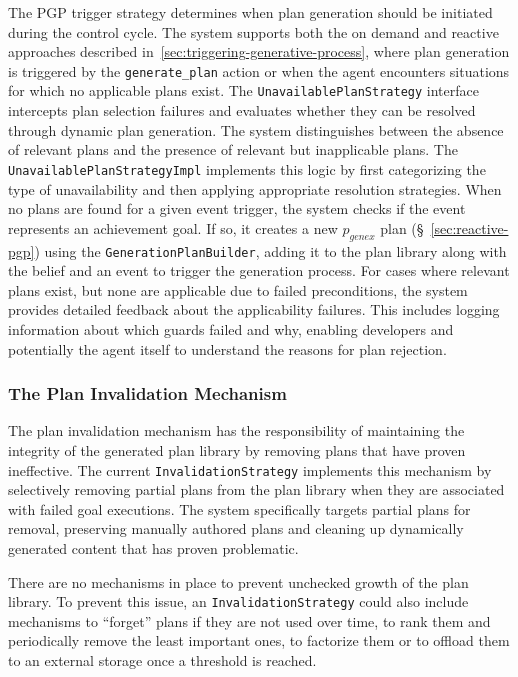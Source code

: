 \documentclass[12pt,a4paper,openright,twoside]{book}
\begin{document}
The PGP trigger strategy determines when plan generation should be initiated during the control cycle. 
%
The system supports both the on demand and reactive approaches described in~\cref{sec:triggering-generative-process}, where plan generation is triggered by the \texttt{generate\_plan} action or when the agent encounters situations for which no applicable plans exist.
%
The \texttt{UnavailablePlanStrategy} interface intercepts plan selection failures and evaluates whether they can be resolved through dynamic plan generation.
%
The system distinguishes between the absence of relevant plans and the presence of relevant but inapplicable plans. 
%
The \texttt{UnavailablePlanStrategyImpl} implements this logic by first categorizing the type of unavailability and then applying appropriate resolution strategies.
%
When no plans are found for a given event trigger, the system checks if the event represents an achievement goal.
%
If so, it creates a new $p_{genex}$ plan (\S~\ref{sec:reactive-pgp}) using the \texttt{GenerationPlanBuilder}, adding it to the plan library along with the  belief and an event to trigger the generation process.
%
For cases where relevant plans exist, but none are applicable due to failed preconditions, the system provides detailed feedback about the applicability failures.
%
This includes logging information about which guards failed and why, enabling developers and potentially the agent itself to understand the reasons for plan rejection.

\subsubsection{The Plan Invalidation Mechanism}\label{sec:plan-invalidation}

The plan invalidation mechanism has the responsibility of maintaining the integrity of the generated plan library by removing plans that have proven ineffective. 
%
The current \texttt{InvalidationStrategy} implements this mechanism by selectively removing partial plans from the plan library when they are associated with failed goal executions.
%
The system specifically targets partial plans for removal, preserving manually authored plans and cleaning up dynamically generated content that has proven problematic.

There are no mechanisms in place to prevent unchecked growth of the plan library.
%
To prevent this issue, an \texttt{InvalidationStrategy} could also include mechanisms to ``forget'' plans if they are not used over time, to rank them and periodically remove the least important ones, to factorize them or to offload them to an external storage once a threshold is reached.
\end{document}
